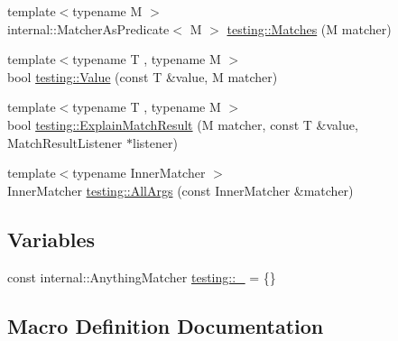 \begin{DoxyCompactItemize}
\item 
{\footnotesize template$<$typename M $>$ }\\internal\+::\+Matcher\+As\+Predicate$<$ M $>$ \hyperlink{namespacetesting_ad53b509ae9cd51040d67f668f99702ae}{testing\+::\+Matches} (M matcher)
\item 
{\footnotesize template$<$typename T , typename M $>$ }\\bool \hyperlink{namespacetesting_ae44c50a3a7f0a46f05c8a0b0592b4a62}{testing\+::\+Value} (const T \&value, M matcher)
\item 
{\footnotesize template$<$typename T , typename M $>$ }\\bool \hyperlink{namespacetesting_a6d5fbd5104dafc63bf705dafbcb5ce18}{testing\+::\+Explain\+Match\+Result} (M matcher, const T \&value, Match\+Result\+Listener $\ast$listener)
\item 
{\footnotesize template$<$typename Inner\+Matcher $>$ }\\Inner\+Matcher \hyperlink{namespacetesting_a2522e94b71f88fbfbbcf6942cd0c6ee0}{testing\+::\+All\+Args} (const Inner\+Matcher \&matcher)
\end{DoxyCompactItemize}
\subsection*{Variables}
\begin{DoxyCompactItemize}
\item 
const internal\+::\+Anything\+Matcher \hyperlink{namespacetesting_a4ba77a3f5b67166ff1b59d96a32346a2}{testing\+::\+\_\+} = \{\}
\end{DoxyCompactItemize}


\subsection{Macro Definition Documentation}
